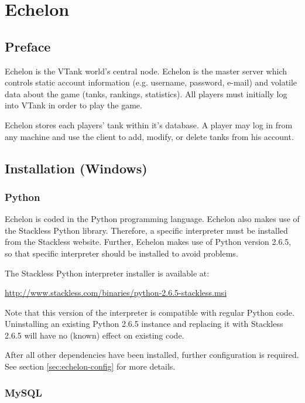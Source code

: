 \chapter{Echelon}
\label{Echelon}
\section{Preface}

Echelon is the VTank world's central node. Echelon is the master server which controls static account information (e.g. username, password, e-mail) and volatile data about the game (tanks, rankings, statistics). All players must initially log into VTank in order to play the game.

Echelon stores each players' tank within it's database. A player may log in from any machine and use the client to add, modify, or delete tanks from his account.

\section{Installation (Windows)}

\subsection{Python}
\label{echelon-install-python}

Echelon is coded in the Python programming language. Echelon also makes use of the Stackless Python library. Therefore, a specific interpreter must be installed from the Stackless website. Further, Echelon makes use of Python version 2.6.5, so that specific interpreter should be installed to avoid problems.

The Stackless Python interpreter installer is available at:

\url{http://www.stackless.com/binaries/python-2.6.5-stackless.msi}

Note that this version of the interpreter is compatible with regular Python code. Uninstalling an existing Python 2.6.5 instance and replacing it with Stackless 2.6.5 will have no (known) effect on existing code.

After all other dependencies have been installed, further configuration is required. See section \ref{sec:echelon-config} for more details.

\subsection{MySQL}

